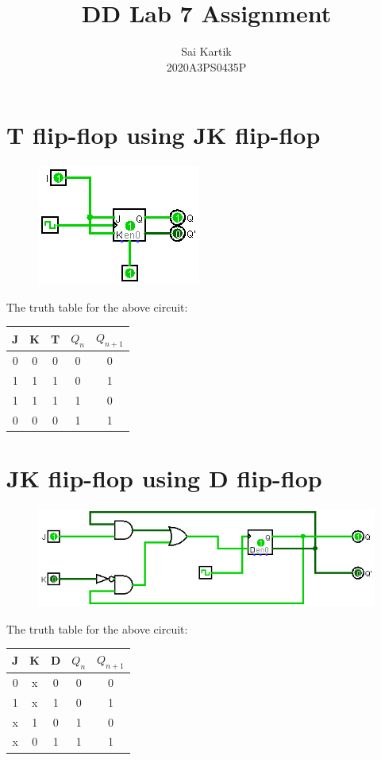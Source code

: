\documentclass[12pt]{article}
\title{DD Lab 7 Assignment}
\author{Sai Kartik \\2020A3PS0435P}
\begin{document}
\maketitle
\section{T flip-flop using JK flip-flop}
\begin{center}
    \begin{figure}[ht]
        \includegraphics{twjk.png}
    \end{figure}
\end{center}
The truth table for the above circuit: \\[2ex]
\begin{tabular}{|c|c|c|c|c|}
    \hline
    J & K & T & $Q_n$ & $Q_{n+1}$ \\
    \hline
    0 & 0 & 0 & 0     & 0         \\
    1 & 1 & 1 & 0     & 1         \\
    1 & 1 & 1 & 1     & 0         \\
    0 & 0 & 0 & 1     & 1         \\
    \hline
\end{tabular}
\newpage
\section{JK flip-flop using D flip-flop}
\begin{center}
    \begin{figure}[ht]
        \includegraphics[scale=0.70]{jkwd.png}
    \end{figure}
\end{center}
The truth table for the above circuit: \\[2ex]
\begin{tabular}{|c|c|c|c|c|}
    \hline
    J & K & D & $Q_n$ & $Q_{n+1}$ \\
    \hline
    0 & x & 0 & 0     & 0         \\
    1 & x & 1 & 0     & 1         \\
    x & 1 & 0 & 1     & 0         \\
    x & 0 & 1 & 1     & 1         \\
    \hline
\end{tabular}
\end{document}
